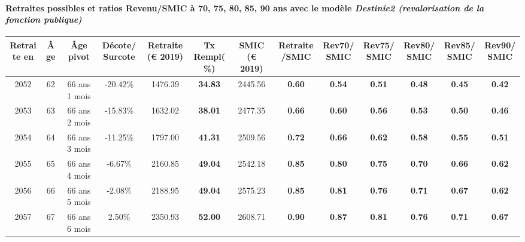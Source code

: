 \paragraph{Retraites possibles et ratios Revenu/SMIC à 70, 75, 80, 85, 90 ans avec le modèle \emph{Destinie2 (revalorisation de la fonction publique)}}  
 
{ \scriptsize \begin{center} 
\begin{tabular}[htb]{|c|c||c|c||c|c||c||c|c|c|c|c|c|} 
\hline 
 Retraite en &  Âge &  Âge pivot &  Décote/Surcote &  Retraite (\euro{} 2019) &  Tx Rempl(\%) &  SMIC (\euro{} 2019) &  Retraite/SMIC &  Rev70/SMIC &  Rev75/SMIC &  Rev80/SMIC &  Rev85/SMIC &  Rev90/SMIC \\ 
\hline \hline 
 2052 &  62 &  66 ans 1 mois &  -20.42\% &  1476.39 &  {\bf 34.83} &  2445.56 &  {\bf {\color{red} 0.60}} &  {\bf {\color{red} 0.54}} &  {\bf {\color{red} 0.51}} &  {\bf {\color{red} 0.48}} &  {\bf {\color{red} 0.45}} &  {\bf {\color{red} 0.42}} \\ 
\hline 
 2053 &  63 &  66 ans 2 mois &  -15.83\% &  1632.02 &  {\bf 38.01} &  2477.35 &  {\bf {\color{red} 0.66}} &  {\bf {\color{red} 0.60}} &  {\bf {\color{red} 0.56}} &  {\bf {\color{red} 0.53}} &  {\bf {\color{red} 0.50}} &  {\bf {\color{red} 0.46}} \\ 
\hline 
 2054 &  64 &  66 ans 3 mois &  -11.25\% &  1797.00 &  {\bf 41.31} &  2509.56 &  {\bf {\color{red} 0.72}} &  {\bf {\color{red} 0.66}} &  {\bf {\color{red} 0.62}} &  {\bf {\color{red} 0.58}} &  {\bf {\color{red} 0.55}} &  {\bf {\color{red} 0.51}} \\ 
\hline 
 2055 &  65 &  66 ans 4 mois &  -6.67\% &  2160.85 &  {\bf 49.04} &  2542.18 &  {\bf {\color{red} 0.85}} &  {\bf {\color{red} 0.80}} &  {\bf {\color{red} 0.75}} &  {\bf {\color{red} 0.70}} &  {\bf {\color{red} 0.66}} &  {\bf {\color{red} 0.62}} \\ 
\hline 
 2056 &  66 &  66 ans 5 mois &  -2.08\% &  2188.95 &  {\bf 49.04} &  2575.23 &  {\bf {\color{red} 0.85}} &  {\bf {\color{red} 0.81}} &  {\bf {\color{red} 0.76}} &  {\bf {\color{red} 0.71}} &  {\bf {\color{red} 0.67}} &  {\bf {\color{red} 0.62}} \\ 
\hline 
 2057 &  67 &  66 ans 6 mois &  2.50\% &  2350.93 &  {\bf 52.00} &  2608.71 &  {\bf {\color{red} 0.90}} &  {\bf {\color{red} 0.87}} &  {\bf {\color{red} 0.81}} &  {\bf {\color{red} 0.76}} &  {\bf {\color{red} 0.71}} &  {\bf {\color{red} 0.67}} \\ 
\hline 
\hline 
\end{tabular} 
\end{center} } 

